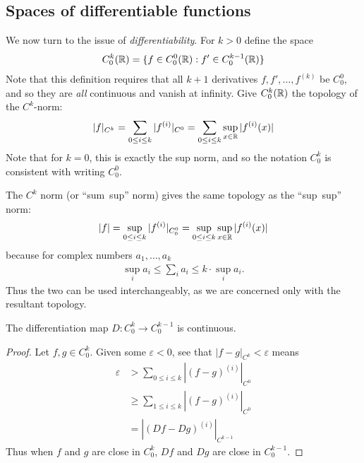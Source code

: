     \subsection{Spaces of differentiable functions}
      We now turn to the issue of \emph{differentiability}.
      For $k>0$ define the space 
      \begin{align*}
        C^k_0(\mathbb{R}) = \{f\in C^0_0(\mathbb{R}) : f'\in C^{k-1}_0(\mathbb{R})\}
      \end{align*}
      Note that this definition requires that all $k+1$ derivatives $f,f',\ldots,f^{(k)}$ be $C^0_0$, and so they are \emph{all} continuous and vanish at infinity.
      Give $C^k_0(\mathbb{R})$ the topology of the $C^k$-norm:
      \begin{align*}
        |f|_{C^k} = \sum_{0\le i\le k} |f^{(i)}|_{C^0} = \sum_{0\le i\le k} \sup_{x\in\mathbb{R}}|f^{(i)}(x)|
      \end{align*}
      Note that for $k=0$, this is exactly the sup norm, and so the notation $C^k_0$ is consistent with writing $C^0_0$.
      \begin{rmk}
        The $C^k$ norm (or ``sum~sup'' norm) gives the same topology as the ``sup~sup'' norm:
        \begin{align*}
          |f|=\sup_{0\le i\le k}|f^{(i)}|_{C^0_0}=\sup_{0\le i\le k}\sup_{x\in\mathbb{R}}|f^{(i)}(x)|
        \end{align*}
        because for complex numbers $a_1,\ldots,a_k$
        \begin{align*}
          \sup_i a_i \le \sum_i a_i \le k\cdot\sup_i a_i\text{.}
        \end{align*}
        Thus the two can be used interchangeably, as we are concerned only with the resultant topology.
      \end{rmk}
      \begin{claim}
        \label{claim:diffcontCk0}
        The differentiation map $D:C^k_0\rightarrow C^{k-1}_0$ is continuous.
        \begin{proof}
          Let $f,g\in C^k_0$.
          Given some $\varepsilon<0$, see that $|f-g|_{C^k} < \varepsilon$ means
          \begin{align*}
            \varepsilon &> \sum_{0\le i\le k} |(f-g)^{(i)}|_{C^0}\\
            &\ge \sum_{1\le i\le k} |(f-g)^{(i)}|_{C^0}\\
            &= |(Df-Dg)^{(i)}|_{C^{k-1}}
          \end{align*}
          Thus when $f$ and $g$ are close in $C^k_0$, $Df$ and $Dg$ are close in $C^{k-1}_0$.
        \end{proof}
      \end{claim}
